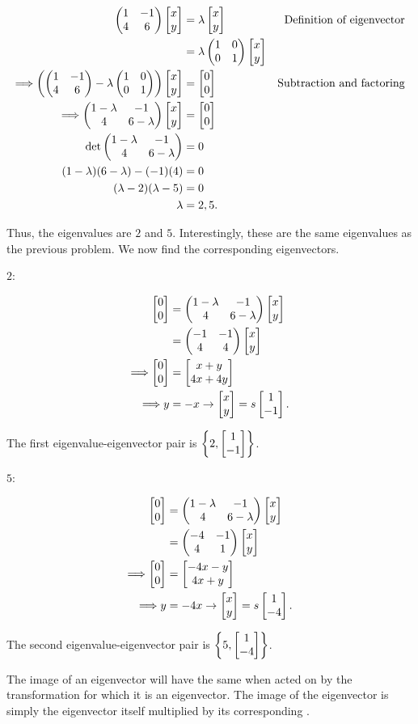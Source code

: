 \documentclass[../gatm_answers.tex]{subfiles}
\begin{document}
\begin{align*}
\begin{pmatrix} 1 & -1 \\ 4 & 6 \end{pmatrix}\begin{bmatrix} x \\ y \end{bmatrix} &= \lambda\begin{bmatrix} x \\ y \end{bmatrix} & \text{Definition of eigenvector} \\
&= \lambda\begin{pmatrix} 1 & 0 \\ 0 & 1 \end{pmatrix}\begin{bmatrix} x \\ y \end{bmatrix} \\
\Longrightarrow \left(\begin{pmatrix} 1 & -1 \\ 4 & 6 \end{pmatrix}-\lambda\begin{pmatrix} 1 & 0 \\ 0 & 1 \end{pmatrix}\right)\begin{bmatrix} x \\ y \end{bmatrix}&=\begin{bmatrix} 0 \\ 0 \end{bmatrix} & \text{Subtraction and factoring} \\
\Longrightarrow \begin{pmatrix} 1-\lambda & -1 \\ 4 & 6-\lambda \end{pmatrix}\begin{bmatrix} x \\ y \end{bmatrix} &= \begin{bmatrix} 0 \\ 0 \end{bmatrix} \\
\det \begin{pmatrix} 1-\lambda & -1 \\ 4 & 6-\lambda \end{pmatrix} &= 0 \\
(1-\lambda)(6-\lambda)-(-1)(4) &= 0 \\
(\lambda-2)(\lambda-5) &= 0 \\
\lambda &= 2,5.\\
\end{align*}

Thus, the eigenvalues are $2$ and $5$. Interestingly, these are the same eigenvalues as the previous problem. We now find the corresponding eigenvectors.

$2$:

\begin{align*}
\begin{bmatrix} 0 \\ 0 \end{bmatrix} &= \begin{pmatrix} 1-\lambda & -1 \\ 4 & 6-\lambda \end{pmatrix}\begin{bmatrix} x \\ y \end{bmatrix} \\
&= \begin{pmatrix} -1 & -1 \\ 4 & 4 \end{pmatrix}\begin{bmatrix} x \\ y \end{bmatrix} \\
\Longrightarrow \begin{bmatrix} 0 \\ 0 \end{bmatrix} &= \begin{bmatrix} x+y \\ 4x+4y \end{bmatrix} \\
\Longrightarrow y&=-x \rightarrow \begin{bmatrix} x \\ y \end{bmatrix}=s\begin{bmatrix} 1 \\ -1 \end{bmatrix}.
\end{align*}

The first eigenvalue-eigenvector pair is $\left\{2, \begin{bmatrix} 1 \\ -1 \end{bmatrix}\right\}$.

$5$:

\begin{align*}
\begin{bmatrix} 0 \\ 0 \end{bmatrix} &= \begin{pmatrix} 1-\lambda & -1 \\ 4 & 6-\lambda \end{pmatrix}\begin{bmatrix} x \\ y \end{bmatrix} \\
&= \begin{pmatrix} -4 & -1 \\ 4 & 1 \end{pmatrix}\begin{bmatrix} x \\ y \end{bmatrix} \\
\Longrightarrow \begin{bmatrix} 0 \\ 0 \end{bmatrix} &= \begin{bmatrix} -4x-y \\ 4x+y \end{bmatrix} \\
\Longrightarrow y&=-4x \rightarrow \begin{bmatrix} x \\ y \end{bmatrix}=s\begin{bmatrix} 1 \\ -4 \end{bmatrix}.
\end{align*}

The second eigenvalue-eigenvector pair is $\left\{5, \begin{bmatrix} 1 \\ -4 \end{bmatrix}\right\}$.

\begin{outer_problem}
\item The image of an eigenvector will have the same \underline{\phantom{direction}} when acted on by the transformation \underline{\phantom{matrix}} for which it is an eigenvector. The image of the eigenvector is simply the eigenvector itself multiplied by its corresponding \underline{\phantom{eigenvalue}}.
\end{outer_problem}
\end{document}
